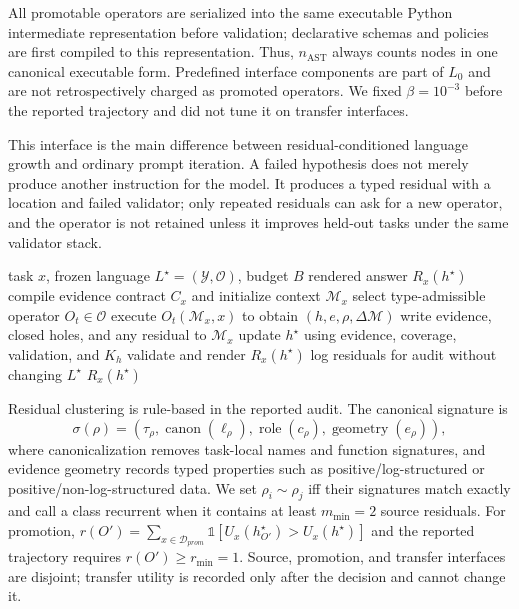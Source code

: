 \documentclass[letterpaper]{article}
\begin{document}
All promotable operators are serialized into the same executable Python
intermediate representation before validation; declarative schemas and
policies are first compiled to this representation. Thus,
$n_{\mathrm{AST}}$ always counts nodes in one canonical executable form.
Predefined interface components are part of $L_0$ and are not retrospectively
charged as promoted operators. We fixed $\beta=10^{-3}$ before the reported
trajectory and did not tune it on transfer interfaces.

This interface is the main difference between residual-conditioned language
growth and ordinary prompt iteration. A failed hypothesis does not merely
produce another instruction for the model. It produces a typed residual with a
location and failed validator; only repeated residuals can ask for a new
operator, and the operator is not retained unless it improves held-out tasks
under the same validator stack.

\begin{algorithm}[H]
\caption{Per-task executable search in a frozen language}
\label{alg:frozen_search}
\begin{algorithmic}[1]
\REQUIRE task $x$, frozen language $L^\star=(\mathcal{Y},\mathcal{O})$, budget $B$
\ENSURE rendered answer $R_x(h^\star)$
\STATE compile evidence contract $C_x$ and initialize context $\mathcal{M}_x$
  \STATE select type-admissible operator $O_t\in\mathcal{O}$
  \STATE execute $O_t(\mathcal{M}_x,x)$ to obtain $(h,e,\rho,\Delta\mathcal{M})$
  \STATE write evidence, closed holes, and any residual to $\mathcal{M}_x$
  \STATE update $h^\star$ using evidence, coverage, validation, and $K_h$
\ENDFOR
\STATE validate and render $R_x(h^\star)$
\STATE log residuals for audit without changing $L^\star$
\RETURN $R_x(h^\star)$
\end{algorithmic}
\end{algorithm}

Residual clustering is rule-based in the reported audit. The canonical
signature is
\[
 \sigma(\rho)=
 (\tau_\rho,\operatorname{canon}(\ell_\rho),
 \operatorname{role}(c_\rho),\operatorname{geometry}(e_\rho)),
\]
where canonicalization removes task-local names and function signatures, and
evidence geometry records typed properties such as positive/log-structured or
positive/non-log-structured data. We set $\rho_i\sim\rho_j$ iff their signatures
match exactly and call a class recurrent when it contains at least
$m_{\min}=2$ source residuals. For promotion,
$r(O')=\sum_{x\in\mathcal{D}_{prom}}
\mathbb{1}[U_x(h^\star_{O'})>U_x(h^\star)]$ and the reported trajectory
requires $r(O')\geq r_{\min}=1$. Source, promotion, and transfer interfaces are
disjoint; transfer utility is recorded only after the decision and cannot
change it.
\end{document}
